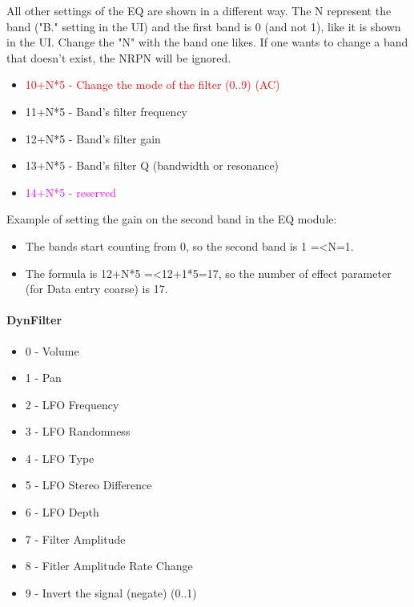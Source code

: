    All other settings of the EQ are shown in a different way.
   The N represent the band ("B." setting in the UI) and the first band is 0
   (and not 1), like it is shown in the UI.
   Change the "N" with the band one likes.
   If one wants to change a band that doesn't exist, the NRPN will be ignored.

   \begin{itemize}
      \item \textcolor{red}{10+N*5 - Change the mode of the filter (0..9) (AC)}
      \item 11+N*5 - Band's filter frequency
      \item 12+N*5 - Band's filter gain
      \item 13+N*5 - Band's filter Q (bandwidth or resonance)
      \item \textcolor{magenta}{14+N*5 - reserved}
   \end{itemize}

   Example of setting the gain on the second band in the EQ module:

   \begin{itemize}
      \item The bands start counting from 0, so the second band is
         1 =\textless N=1.
      \item The formula is 12+N*5 =\textless 12+1*5=17, so the number of effect
         parameter (for Data entry coarse) is 17.
   \end{itemize}

\paragraph{DynFilter}

   \begin{itemize}
      \item 0 - Volume
      \item 1 - Pan
      \item 2 - LFO Frequency
      \item 3 - LFO Randomness
      \item 4 - LFO Type
      \item 5 - LFO Stereo Difference
      \item 6 - LFO Depth
      \item 7 - Filter Amplitude
      \item 8 - Fitler Amplitude Rate Change
      \item 9 - Invert the signal (negate) (0..1)
   \end{itemize}

